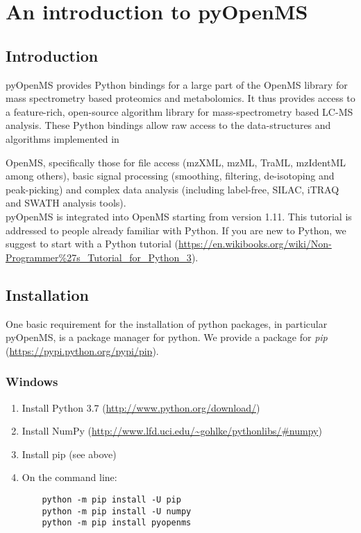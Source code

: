 
\newpage
\section{An introduction to pyOpenMS}

\subsection{Introduction}
pyOpenMS provides Python bindings for a large part of the OpenMS library for mass spectrometry based proteomics and metabolomics. It thus provides access to a feature-rich, open-source algorithm library for mass-spectrometry based LC-MS analysis. These Python bindings allow raw access to the data-structures and algorithms implemented in {OpenMS, specifically those for file access (mzXML, mzML, TraML, mzIdentML among others), basic signal processing (smoothing, filtering, de-isotoping and peak-picking) and complex data analysis (including label-free, SILAC, iTRAQ and SWATH analysis tools).\\

\noindent pyOpenMS is integrated into OpenMS starting from version 1.11. This tutorial is addressed to people already familiar with Python. If you are new to Python, we suggest to start with a Python tutorial (\url{https://en.wikibooks.org/wiki/Non-Programmer%27s_Tutorial_for_Python_3}).

\subsection{Installation}
One basic requirement for the installation of python packages, in particular pyOpenMS, is a package manager for python. We provide a package for \textit{pip} (\url{https://pypi.python.org/pypi/pip}).

\subsubsection{Windows}
\begin{enumerate}
  \item Install Python 3.7 (\url{http://www.python.org/download/})
  \item Install NumPy (\url{http://www.lfd.uci.edu/~gohlke/pythonlibs/#numpy})
  \item Install pip (see above)
  \item On the command line:
    \begin{lstlisting}
    python -m pip install -U pip
    python -m pip install -U numpy
    python -m pip install pyopenms
    \end{lstlisting}
\end{enumerate}

}
